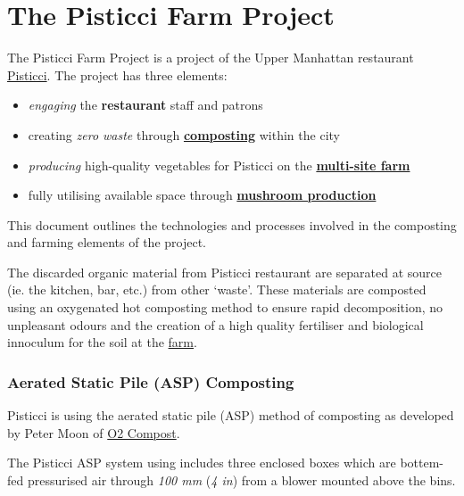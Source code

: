 \section{The Pisticci Farm Project}\label{the-pisticci-farm-project}

The Pisticci Farm Project is a project of the Upper Manhattan restaurant
\href{http://www.pisticcinyc.com/}{Pisticci}. The project has three
elements:

\begin{itemize}
\itemsep1pt\parskip0pt
\item
  \emph{engaging} the \textbf{restaurant} staff and patrons
\item
  creating \emph{zero waste} through
  \hyperref[compost]{\textbf{composting}} within the city
\item
  \emph{producing} high-quality vegetables for Pisticci on the
  \hyperref[farm]{\textbf{multi-site farm}}
\item
  fully utilising available space through
  \hyperref[mushrooms]{\textbf{mushroom production}}
\end{itemize}

This document outlines the technologies and processes involved in the
composting and farming elements of the project.


The discarded organic material from Pisticci restaurant are separated at
source (ie. the kitchen, bar, etc.) from other `waste'. These materials
are composted using an oxygenated hot composting method to ensure rapid
decomposition, no unpleasant odours and the creation of a high quality
fertiliser and biological innoculum for the soil at the
\hyperref[farm]{farm}.

\subsubsection{Aerated Static Pile (ASP)
Composting}\label{aerated-static-pile-asp-composting}

Pisticci is using the aerated static pile (ASP) method of composting as
developed by Peter Moon of \href{http://www.o2compost.com}{O2 Compost}.

The Pisticci ASP system using includes three enclosed boxes which are
bottem-fed pressurised air through \emph{100 mm} (\emph{4 in}) from a
blower mounted above the bins.

